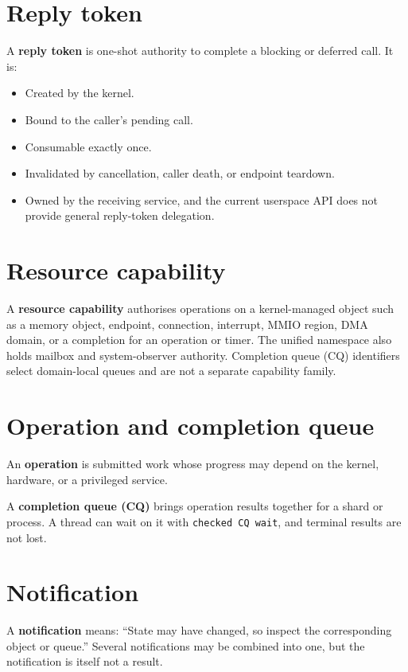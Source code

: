 \section{Reply token}

A \textbf{reply token} is one-shot authority to complete a blocking or deferred
call. It is:

\begin{itemize}
    \item Created by the kernel.
    \item Bound to the caller's pending call.
    \item Consumable exactly once.
    \item Invalidated by cancellation, caller death, or endpoint teardown.
    \item Owned by the receiving service, and the current userspace API does not
        provide general reply-token delegation.
\end{itemize}

\section{Resource capability}

A \textbf{resource capability} authorises operations on a kernel-managed object
such as a memory object, endpoint, connection, interrupt, MMIO region, DMA domain,
or a completion for an operation or timer. The unified namespace also holds
mailbox and system-observer authority. Completion queue (CQ) identifiers select
domain-local queues and are not a separate capability family.

\section{Operation and completion queue}

An \textbf{operation} is submitted work whose progress may depend on the kernel,
hardware, or a privileged service.

A \textbf{completion queue (CQ)} brings operation results together for a shard
or process. A thread can wait on it with \texttt{checked CQ wait}, and terminal
results are not lost.

\section{Notification}

A \textbf{notification} means: ``State may have changed, so inspect the corresponding
object or queue.'' Several notifications may be combined into one, but the
notification is itself not a result.

